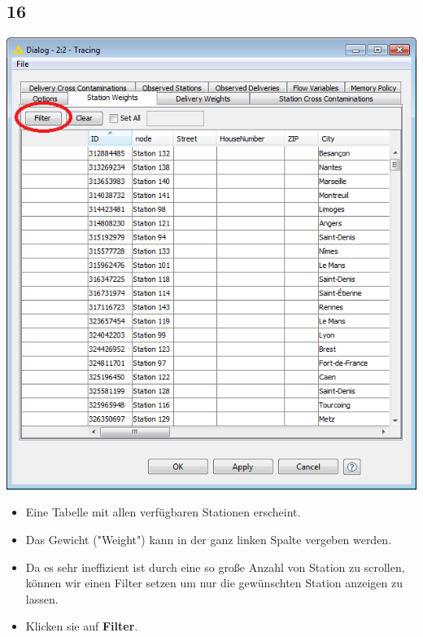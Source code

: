\documentclass{beamer}
\begin{document}
\subsection{16}
\begin{frame}
	\begin{center}
  		\includegraphics[height=0.5\textheight]{16.png}
	\end{center}
	\begin{itemize}
		\item Eine Tabelle mit allen verfügbaren Stationen erscheint.
		\item Das Gewicht ("Weight") kann in der ganz linken Spalte vergeben werden.
		\item Da es sehr ineffizient ist durch eine so große Anzahl von Station zu scrollen, können wir einen Filter setzen um nur die gewünschten Station anzeigen zu lassen.
		\item Klicken sie auf \textbf{Filter}.
	\end{itemize}
\end{frame}
\end{document}
